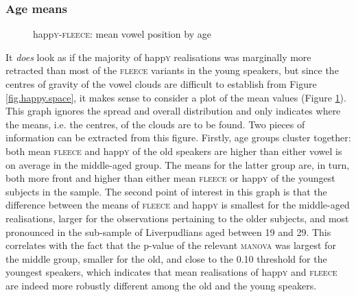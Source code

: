 \subsubsection{Age means}

\begin{figure}[h!]
	\centering
	
	\caption{happ\textsc{y}-\textsc{fleece}: mean vowel position by age}
	\label{fig.happy.space.means}
\end{figure}

It \emph{does} look as if the majority of happ\textsc{y} realisations was marginally more retracted than most of the \textsc{fleece} variants in the young speakers, but since the centres of gravity of the vowel clouds are difficult to establish from Figure \ref{fig.happy.space}, it makes sense to consider a plot of the mean values (Figure \ref{fig.happy.space.means}).
This graph ignores the spread and overall distribution and only indicates where the means, i.e. the centres, of the  clouds are to be found.
Two pieces of information can be extracted from this figure.
Firstly, age groups cluster together: both mean \textsc{fleece} and happ\textsc{y} of the old speakers are higher than either vowel is on average in the middle-aged group.
The means for the latter group are, in turn, both more front and higher than either mean \textsc{fleece} or happ\textsc{y} of the youngest subjects in the sample.
The second point of interest in this graph is that the difference between the means of \textsc{fleece} and happ\textsc{y} is smallest for the middle-aged realisations, larger for the observations pertaining to the older subjects, and most pronounced in the sub-sample of Liverpudlians aged between 19 and 29.
This correlates with the fact that the p-value of the relevant \textsc{manova} was largest for the middle group, smaller for the old, and close to the 0.10 threshold for the youngest speakers, which indicates that mean realisations of happ\textsc{y} and \textsc{fleece} are indeed more robustly different among the old and the young speakers.

